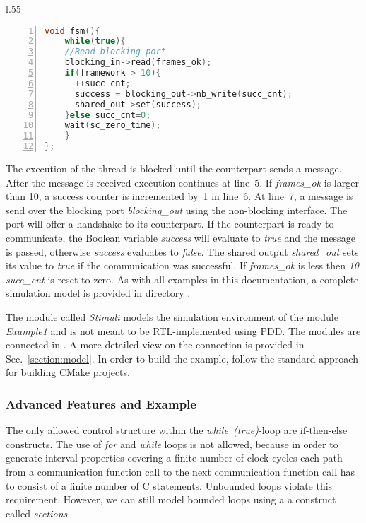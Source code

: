 \begin{wrapfigure}{l}{.55\textwidth}
\begin{lstlisting}[language=C++,
caption={Example1},
label={lst:example_1},
numbers=left,
captionpos=b,   
basicstyle={\footnotesize},
xleftmargin=5.0ex]
void fsm(){
    while(true){
    //Read blocking port
    blocking_in->read(frames_ok);
    if(framework > 10){
      ++succ_cnt;
      success = blocking_out->nb_write(succ_cnt);
      shared_out->set(success);
    }else succ_cnt=0;
    wait(sc_zero_time);
    }
};
\end{lstlisting}
\end{wrapfigure}

The execution of the thread is blocked until the counterpart sends a
message. %
After the message is received execution continues at line~5. %
If \textit{frames\_ok} is larger than 10, a success counter is
incremented by~1 in line~6. %
At line~7, a message is send over the blocking port
\textit{blocking\_out} using the non-blocking interface. %
The port will offer a handshake to its counterpart. %
If the counterpart is ready to communicate, the Boolean variable
\textit{success} will evaluate to \textit{true} and the message is
passed, otherwise \textit{success} evaluates to \textit{false}. %
The shared output \textit{shared\_out} sets its value to \textit{true}
if the communication was successful. %
If \textit{frames\_ok} is less then \textit{10} \textit{succ\_cnt} is
reset to zero. %
As with all examples in this documentation, a complete 
simulation model is provided in directory . %

The module called \textit{Stimuli} models the simulation environment of the
module \textit{Example1} and is not meant to be RTL-implemented using PDD. %
The modules are connected in . %
A more detailed view on the connection is provided in
Sec.~\ref{section:model}. %
In order to build the example, follow the standard approach for
building CMake projects. %

\subsubsection{Advanced Features and Example}
\label{sec:fsm-advanced}


The only allowed control structure within the
\textit{while~(true)}-loop are if-then-else constructs. %
The use of \textit{for} and \textit{while} loops is not allowed,
because in order to generate interval properties covering a finite number of clock cycles %
 each path from a communication function call to the next
communication function call has to consist of a finite number of C
statements. %
Unbounded loops violate this requirement.  %
%
However, we can still model bounded loops using a a \SYSTEMCPPA{}
  construct called \textit{sections}. %

